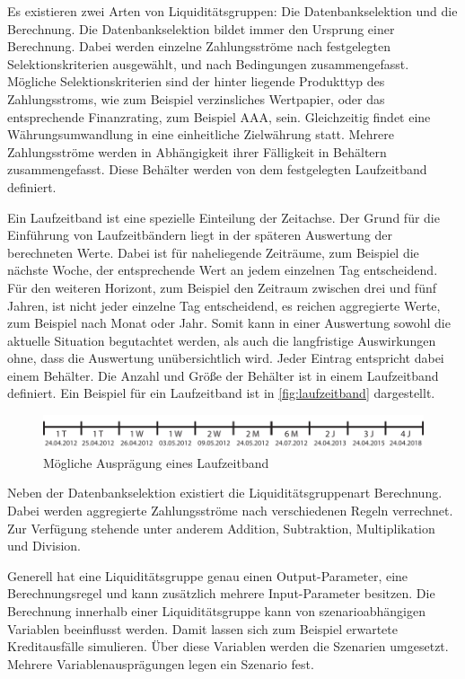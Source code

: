 \begin{onehalfspacing}
Es existieren zwei Arten von Liquiditätsgruppen: Die Datenbankselektion und die Berechnung. Die Datenbankselektion bildet immer den Ursprung einer Berechnung. Dabei werden einzelne Zahlungsströme nach festgelegten Selektionskriterien ausgewählt, und nach Bedingungen zusammengefasst. Mögliche Selektionskriterien sind der hinter liegende Produkttyp des Zahlungsstroms, wie zum Beispiel verzinsliches Wertpapier, oder das entsprechende Finanzrating, zum Beispiel AAA, sein. Gleichzeitig findet eine Währungsumwandlung in eine einheitliche Zielwährung statt. Mehrere Zahlungsströme werden in Abhängigkeit ihrer Fälligkeit in Behältern zusammengefasst. Diese Behälter werden von dem festgelegten Laufzeitband definiert.

Ein Laufzeitband ist eine spezielle Einteilung der Zeitachse. Der Grund für die Einführung von Laufzeitbändern liegt in der späteren Auswertung der berechneten Werte. Dabei ist für naheliegende Zeiträume, zum Beispiel die nächste Woche, der entsprechende Wert an jedem einzelnen Tag entscheidend. Für den weiteren Horizont, zum Beispiel den Zeitraum zwischen drei und fünf Jahren, ist nicht jeder einzelne Tag  entscheidend, es reichen aggregierte Werte, zum Beispiel nach Monat oder Jahr. Somit kann in einer Auswertung sowohl die aktuelle Situation begutachtet werden, als auch die langfristige Auswirkungen ohne, dass die Auswertung unübersichtlich wird. Jeder Eintrag entspricht dabei einem Behälter. Die Anzahl und Größe der Behälter ist in einem Laufzeitband definiert. Ein Beispiel für ein Laufzeitband ist in \vref{fig:laufzeitband} dargestellt.

\begin{figure}[!ht]
\centering
\setlength{\unitlength}{1mm}
\includegraphics[width=15cm]{images/Abbildung4-Laufzeitband.pdf}
\caption{Mögliche Ausprägung eines Laufzeitband\label{fig:laufzeitband}}
\end{figure}

Neben der Datenbankselektion existiert die Liquiditätsgruppenart Berechnung. Dabei werden aggregierte Zahlungsströme nach verschiedenen Regeln verrechnet. Zur Verfügung stehende unter anderem Addition, Subtraktion, Multiplikation und Division. 

Generell hat eine Liquiditätsgruppe genau einen Output-Parameter, eine Berechnungsregel und kann zusätzlich mehrere Input-Parameter besitzen. Die Berechnung innerhalb einer Liquiditätsgruppe kann von szenarioabhängigen Variablen beeinflusst werden. Damit lassen sich zum Beispiel erwartete Kreditausfälle simulieren. Über diese Variablen werden die Szenarien umgesetzt. Mehrere Variablenausprägungen legen ein Szenario fest.


\end{onehalfspacing}
